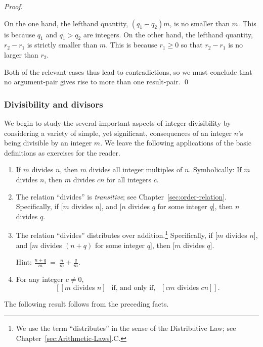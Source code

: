 \begin{proof}
\begin{enumerate}
On the one hand, the lefthand quantity, $(q_1 - q_2) m$, is no smaller
than $m$.  This is because $q_1$ and $q_1 > q_2$ are integers.  On the
other hand, the lefthand quantity, $r_2 - r_1$ is strictly smaller
than $m$.  This is because $r_1 \geq 0$ so that $r_2 - r_1$ is no
larger than $r_2$.
\end{enumerate}
Both of the relevant cases thus lead to contradictions, so we must
conclude that no argument-pair gives rise to more than one
result-pair.  \qed
\end{proof}


\subsubsection{Divisibility and divisors}
\label{sec:divisibility+GCD}

We begin to study the several important aspects of integer
divisibility by considering a variety of simple, yet significant,
consequences of an integer $n$'s being divisible by an integer $m$.
We leave the following applications of the basic definitions as
exercises for the reader.

\begin{prop}
\label{thm:basic-divisibility}
\begin{enumerate}
\item
If $m$ divides $n$, then $m$ divides all integer multiples of $n$.
Symbolically: If $m$ divides $n$, then $m$ divides $cn$ for all
integers $c$.
\item
The relation ``divides'' is {\em transitive}; see
Chapter~\ref{sec:order-relation}.  Specifically, if [$m$ divides $n$],
and [$n$ divides $q$ for some integer $q$], then $n$ divides $q$.
\item
The relation ``divides'' distributes over addition.\footnote{We use
  the term ``distributes'' in the sense of the Distributive Law; see
  Chapter~\ref{sec:Arithmetic-Laws}.C.}  Specifically, if [$m$ divides
  $n$], and [$m$ divides $(n+q)$ for some integer $q$], then [$m$
  divides $q$].

Hint: $\displaystyle \frac{n+q}{m} \ = \ \frac{n}{m} + \frac{q}{m}$.

\item 
For any integer $c \neq 0$,
\[ \left[[m \mbox{ divides } n] \ \ \mbox{ if, and only if, } \ \ [cm
    \mbox{ divides } cn] \right]. \]
\end{enumerate}
\end{prop}

The following result follows from the preceding facts.

